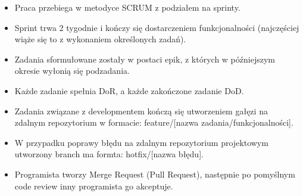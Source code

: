 
\begin{itemize}	
	\item Praca przebiega w metodyce SCRUM z podziałem na sprinty.
	\item Sprint trwa 2 tygodnie i kończy się dostarczeniem funkcjonalności (najczęściej wiąże się to z wykonaniem określonych zadań).
	\item Zadania sformułowane zostały w postaci epik, z których w późniejszym okresie wyłonią się podzadania.
	\item Każde zadanie spełnia DoR, a każde zakończone zadanie DoD.
	\item Zadania związane z developmentem kończą się utworzeniem gałęzi na zdalnym repozytorium w formacie: feature/[nazwa zadania/funkcjonalności].
	\item W przypadku poprawy błędu na zdalnym repozytorium projektowym utworzony branch ma formta: hotfix/[nazwa błędu].
	\item Programista tworzy Merge Request (Pull Request), następnie po pomyślnym code review inny programista go akceptuje.
\end{itemize}
